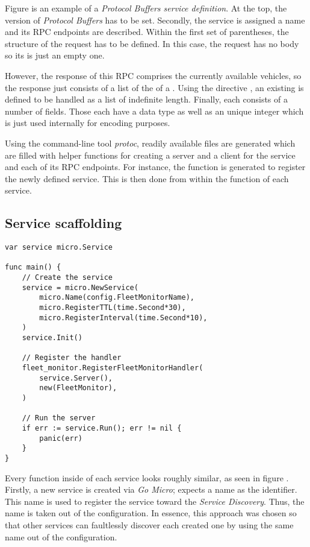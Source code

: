 \documentclass[12pt,a4paper,twoside]{report}
\begin{document}
Figure  is an example of
a \textit{Protocol Buffers service definition}.
At the top, the version of \textit{Protocol Buffers} has to be set.
Secondly, the service is assigned a name and its RPC endpoints are described.
Within the first set of parentheses, the structure of the request has to be
defined. In this case, the request has no body so its  is just an
empty one.

However, the response of this RPC comprises the currently available vehicles,
so the response just consists of a list of the  of a .
Using the directive , an existing  is defined to be
handled as a list of indefinite length.
Finally, each  consists of a number of fields. Those each have
a data type as well as an unique integer which is just used internally for
encoding purposes.

Using the command-line tool \textit{protoc}, readily available  files
are generated which are filled with helper functions for creating
a server and a client for the service and each of its RPC endpoints.
For instance, the function  is generated
to register the newly defined service.
This is then done from within the  function of each service.

\subsection{Service scaffolding}

\begin{lstlisting}[title=services/fleet-monitor/main.go, float, floatplacement=H]
var service micro.Service

func main() {
	// Create the service
	service = micro.NewService(
		micro.Name(config.FleetMonitorName),
		micro.RegisterTTL(time.Second*30),
		micro.RegisterInterval(time.Second*10),
	)
	service.Init()

    // Register the handler
	fleet_monitor.RegisterFleetMonitorHandler(
		service.Server(),
		new(FleetMonitor),
	)

    // Run the server
	if err := service.Run(); err != nil {
		panic(err)
	}
}
\end{lstlisting}

Every  function inside of each service looks roughly similar,
as seen in figure .
Firstly, a new service is created via \textit{Go Micro};
 expects a name as the identifier.
This name is used to register the service toward the \textit{Service Discovery}.
Thus, the name is taken out of the configuration.
In essence, this approach was chosen so that other services can
faultlessly discover each created one by using the same name out of the configuration.
\end{document}
